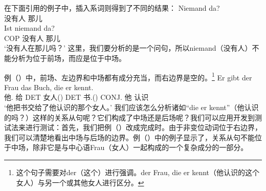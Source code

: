 在下面\citet[]{Paul1919a}引用的例子中，插入系词则得到了不同的结果：
\eal
\ex 
\gll Niemand da?\\
	 没有人 那儿\\
\ex 
\gll Ist niemand da?\\
	 COP 没有人 那儿\\
\glt `没有人在那儿吗？'
\zl
这里，我们要分析的是一个问句，所以niemand（没有人）不能分析为位于前场，而应是位于中场。

例（）中，前场、左边界和中场都有成分充当，而右边界是空的。\footnote{这个句子需要对der（这个）进行强调。der Frau, die er kennt（他认识的这个女人）与另一个或其他女人进行区分。}
\ea
\gll Er        gibt  der Frau        das Buch,       die er kennt.\\
     他.\mas{} 给 DET 女人(\fem) DET 书.(\neu) CONJ.\fem{} 他 认识\\
\glt `他把书交给了他认识的那个女人。'
\z 
我们应该怎么分析诸如“die er kennt”（他认识的吗？）这样的关系从句呢？它们构成了中场还是后场呢？我们可以应用开发到测试法来进行测试：首先，我们把例（）改成完成时。由于非变位动词位于右边界，我们可以清楚地看出中场与后场的边界。例（）中的例子显示了，关系从句不能位于中场，除非它是与中心语Frau（女人）一起构成的一个复杂成分的一部分。
\eal
{}
\zl

